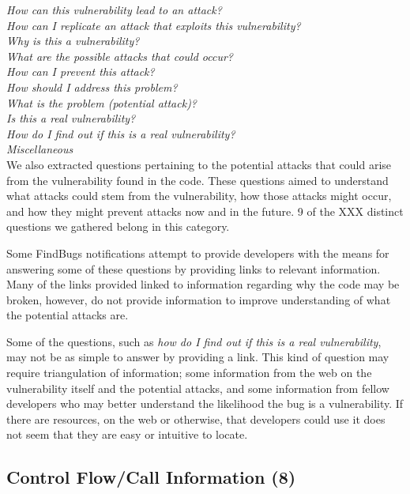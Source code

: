 \documentclass[conference]{IEEEtran}
\begin{document}
\noindent\emph{How can this vulnerability lead to an attack?} \\
\emph{How can I replicate an attack that exploits this vulnerability?} \\
\emph{Why is this a vulnerability?} \\
\emph{What are the possible attacks that could occur?} \\
\emph{How can I prevent this attack?} \\
\emph{How should I address this problem? } \\
\emph{What is the problem (potential attack)?} \\
\emph{Is this a real vulnerability?} \\
\emph{How do I find out if this is a real vulnerability?} \\
\emph{Miscellaneous} \\

We also extracted questions pertaining to the potential attacks that could arise from the vulnerability found in the code. These questions aimed to understand what attacks could stem from the vulnerability, how those attacks might occur, and how they might prevent attacks now and in the future. 9 of the XXX distinct questions we gathered belong in this category.

Some FindBugs notifications attempt to provide developers with the means for answering some of these questions by providing links to relevant information. Many of the links provided linked to information regarding why the code may be broken, however, do not provide information to improve understanding of what the potential attacks are.  

Some of the questions, such as \emph{how do I find out if this is a real vulnerability}, may not be as simple to answer by providing a link. This kind of question may require triangulation of information; some information from the web on the vulnerability itself and the potential attacks, and some information from fellow developers who may better understand the likelihood the bug is a vulnerability. If there are resources, on the web or otherwise, that developers could use it does not seem that they are easy or intuitive to locate.



\noindent\subsection{\textbf{Control Flow/Call Information (8)}}
\end{document}
